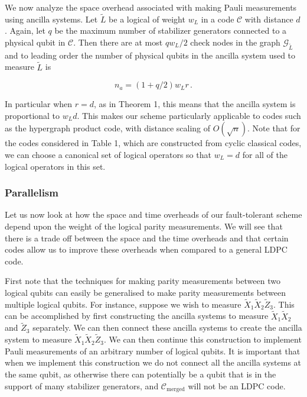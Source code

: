 \documentclass[reprint,
superscriptaddress,
 amsmath,amssymb,
 aps, longbibliography
]{revtex4-1}
\newcommand{\rev}[1]{{#1}}
\begin{document}
We now analyze the space overhead associated with making Pauli measurements using ancilla systems. Let $\tilde{L}$ be a logical of weight $w_L$ in a code $\mathcal{C}$ with distance $d$. Again, let $q$ be the maximum number of stabilizer generators connected to a physical qubit in $\mathcal{C}$. Then there are at most $qw_L/2$ check nodes in the graph $\mathcal{G}_{\tilde{L}}$ and to leading order the number of physical qubits in the ancilla system used to measure $\tilde{L}$ is

\begin{equation} \label{eq:size}
    \rev{n_a = (1 + q/2) w_L r} \,.
\end{equation}

\rev{In particular when $r = d$, as in Theorem 1, this means that the ancilla system is proportional to $w_L d$. This makes our scheme particularly applicable to codes such as the hypergraph product code, with distance scaling of $O(\sqrt{n})$.} Note that for the codes considered in Table 1, which are constructed from cyclic classical codes, we can choose a \rev{canonical set of logical operators} so that $w_L = d$ for all of the logical operators in this set. 

\subsubsection{\label{sec:parallel}Parallelism}

Let us now look at how the space and time overheads of our fault-tolerant scheme depend upon the weight of the logical parity measurements. We will see that there is a trade off between the space and the time overheads and that certain codes allow us to improve these overheads when compared to a general LDPC code. 

First note that the techniques for making parity measurements between two logical qubits can easily be generalised to make parity measurements between multiple logical qubits. For instance, suppose we wish to measure $\tilde{X}_1\tilde{X}_2\tilde{Z}_3$. This can be accomplished by first constructing the ancilla systems to measure $\tilde{X}_1\tilde{X}_2$ and $\tilde{Z}_3$ separately. We can then connect these ancilla systems to create the ancilla system to measure $\tilde{X}_1\tilde{X}_2\tilde{Z}_3$. We can then continue this construction to implement Pauli measurements of an arbitrary number of logical qubits. It is important that when we implement this construction we do not connect all the ancilla systems at the same qubit, as otherwise there can potentially be a qubit that is in the support of many stabilizer generators, and $\mathcal{C}_{\text{merged}}$ will not be an LDPC code.
\end{document}
